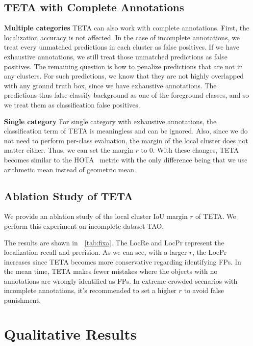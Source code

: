 \documentclass[runningheads]{llncs}
\newcommand{\parsection}[1]{\vspace{1mm}\noindent\textbf{#1 }}
\begin{document}
\subsection{TETA with Complete Annotations}

\parsection{Multiple categories}
TETA can also work with complete annotations. First, the localization accuracy is not affected.
In the case of incomplete annotations, we treat every unmatched predictions in each cluster as false positives.
If we have exhaustive annotations, we still treat those unmatched predictions as false positives.
The remaining question is how to penalize predictions that are not in any clusters.
For such predictions,
we know that they are not highly overlapped with any ground truth box, since we have exhaustive annotations.
The predictions thus false classify background as one of the foreground classes,
and so we treat them as classification false positives.

\parsection{Single category}
For single category with exhaustive annotations, the classification term of TETA is meaningless and can be ignored.
Also, since we do not need to perform per-class evaluation, the margin of the local cluster does not matter either.
Thus, we can set the margin $r$ to 0.
With these changes, TETA becomes similar to the HOTA~\cite{hota} metric with the only difference being that we use arithmetic mean instead of geometric mean.


\subsection{Ablation Study of TETA}

We provide an ablation study of the local cluster IoU margin $r$ of TETA. We perform this experiment on incomplete dataset TAO.

The results are shown in~\tablename~\ref{tab:fixa}. The LocRe and LocPr represent the localization recall and precision. As we can see, with a larger $r$, the LocPr increases since TETA becomes more conservative regarding identifying FPs. In the mean time, TETA makes fewer mistakes where the objects with no annotations are wrongly identified as FPs. In extreme crowded scenarios with incomplete annotations, it's recommended to set a higher $r$ to avoid false punishment.



\section{Qualitative Results}
\end{document}

